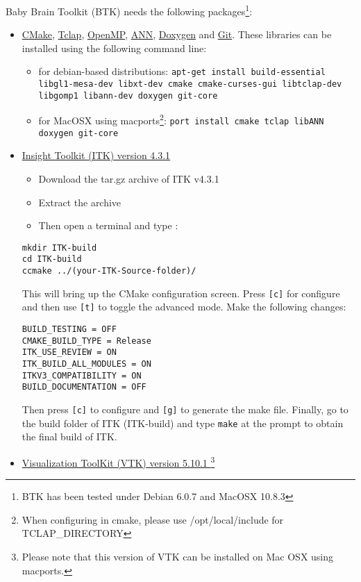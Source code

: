 \documentclass[a4paper,10pt]{article}
\begin{document}
Baby Brain Toolkit (BTK) needs the following packages\footnote{BTK has been tested under Debian 6.0.7 and MacOSX 10.8.3}:
\begin{itemize}
 \item \href{http://www.cmake.org}{CMake}, \href{http://tclap.sourceforge.net}{Tclap}, \href{http://openmp.org}{OpenMP}, \href{http://www.cs.umd.edu/\string~mount/ANN}{ANN}, \href{http://www.doxygen.org}{Doxygen} and \href{http://git-scm.com/}{Git}. These libraries can be installed using the following command line:
 \begin{itemize}
 \item for debian-based distributions: \texttt{apt-get install build-essential libgl1-mesa-dev libxt-dev cmake cmake-curses-gui libtclap-dev libgomp1 libann-dev  doxygen git-core}
 \item for MacOSX using macports\footnote{When configuring in cmake, please use /opt/local/include for TCLAP\_DIRECTORY}: \texttt{port install cmake tclap libANN doxygen git-core}
 \end{itemize}
 \item \href{http://www.itk.org/ITK/resources/software.html}{Insight Toolkit (ITK) version 4.3.1}
 \begin{itemize}
 \item Download the tar.gz archive of ITK v4.3.1
 \item Extract the archive 
 \item Then open a terminal and type :
 \end{itemize}
\begin{verbatim}
mkdir ITK-build
cd ITK-build
ccmake ../(your-ITK-Source-folder)/
\end{verbatim}
This will bring up the CMake configuration screen. Press \texttt{[c]} for
configure and then use \texttt{[t]} to toggle the advanced mode. Make the
following changes:
\begin{verbatim}
BUILD_TESTING = OFF
CMAKE_BUILD_TYPE = Release
ITK_USE_REVIEW = ON
ITK_BUILD_ALL_MODULES = ON
ITKV3_COMPATIBILITY = ON
BUILD_DOCUMENTATION = OFF
\end{verbatim}
Then press \texttt{[c]} to configure and \texttt{[g]} to generate the make file.
Finally, go to the build folder of ITK (ITK-build) and type \texttt{make} at the prompt to obtain the final build of ITK.
   \item \href{http://www.vtk.org/VTK/resources/software.html#previous}{Visualization ToolKit (VTK) version 5.10.1 }\footnote{Please note that this version of VTK can be installed on Mac OSX using macports.}

\end{itemize}
\end{document}
